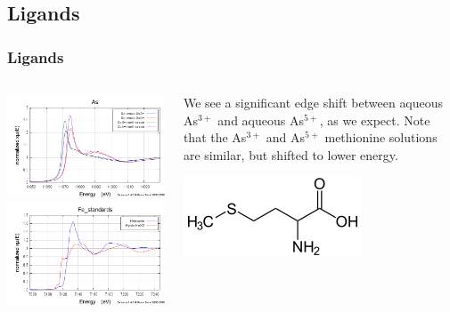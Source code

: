 \documentclass[10pt, xcolor=x11names, compress]{beamer}
\begin{document}
\subsection{Ligands}
\begin{frame}
  \frametitle{Ligands}


  \begin{columns}
    \begin{column}{0.6\linewidth}
      \includegraphics[width=0.9\linewidth]{images/As.png}\\
      \includegraphics[width=0.9\linewidth]{images/Fe.png}
    \end{column}
    \begin{column}{0.4\linewidth}
      We see a significant edge shift between {\color{Blue3}aqueous
        As$^{3+}$} and {\color{Red2}aqueous As$^{5+}$}, as we expect.
      Note that the {\color{Green4}As$^{3+}$} and
      {\color{Purple4}As$^{5+}$} methionine solutions are similar, but
      shifted to lower energy.

      \includegraphics[width=0.7\linewidth]{images/methionine.png}


\end{column}
\end{columns}
\end{frame}
\end{document}
